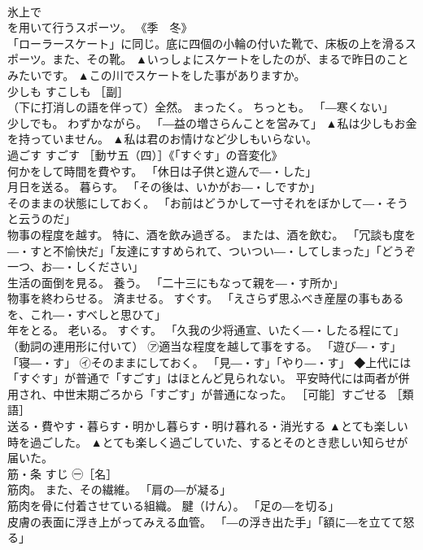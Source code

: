 \documentclass[8pt]{extreport}
\begin{document}
\begin{CJK}{UTF8}{min}
\\	氷上で 
\\	を用いて行うスポーツ。 《季　冬》 
\\	「ローラースケート」に同じ。底に四個の小輪の付いた靴で、床板の上を滑るスポーツ。また、その靴。	▲いっしょにスケートをしたのが、まるで昨日のことみたいです。 ▲この川でスケートをした事がありますか。
\\	少しも	すこしも	［副］ 
\\	（下に打消しの語を伴って）全然。 まったく。 ちっとも。 「―寒くない」 
\\	少しでも。 わずかながら。 「―益の増さらんことを営みて」	▲私は少しもお金を持っていません。 ▲私は君のお情けなど少しもいらない。
\\	過ごす	すごす	［動サ五（四）］《「すぐす」の音変化》 
\\	何かをして時間を費やす。 「休日は子供と遊んで―・した」 
\\	月日を送る。 暮らす。 「その後は、いかがお―・しですか」 
\\	そのままの状態にしておく。 「お前はどうかして一寸それをぼかして―・そうと云うのだ」 
\\	物事の程度を越す。 特に、酒を飲み過ぎる。 または、酒を飲む。 「冗談も度を―・すと不愉快だ」「友達にすすめられて、ついつい―・してしまった」「どうぞ一つ、お―・しください」 
\\	生活の面倒を見る。 養う。 「二十三にもなって親を―・す所か」 
\\	物事を終わらせる。 済ませる。 すぐす。 「えさらず思ふべき産屋の事もあるを、これ―・すべしと思ひて」 
\\	年をとる。 老いる。 すぐす。 「久我の少将通宣、いたく―・したる程にて」 
\\	（動詞の連用形に付いて） ㋐適当な程度を越して事をする。 「遊び―・す」「寝―・す」 ㋑そのままにしておく。 「見―・す」「やり―・す」 ◆上代には「すぐす」が普通で「すごす」はほとんど見られない。 平安時代には両者が併用され、中世末期ごろから「すごす」が普通になった。 ［可能］すごせる ［類語］
\\	送る・費やす・暮らす・明かし暮らす・明け暮れる・消光する	▲とても楽しい時を過ごした。 ▲とても楽しく過ごしていた、するとそのとき悲しい知らせが届いた。
\\	筋・条	すじ	㊀［名］ 
\\	筋肉。 また、その繊維。 「肩の―が凝る」 
\\	筋肉を骨に付着させている組織。 腱（けん）。 「足の―を切る」 
\\	皮膚の表面に浮き上がってみえる血管。 「―の浮き出た手」「額に―を立てて怒る」 

\end{CJK}
\end{document}
